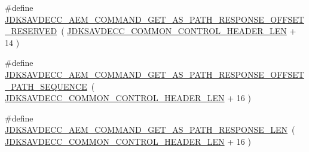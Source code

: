 \begin{DoxyCompactItemize}
\item 
\#define \hyperlink{group__command__get__as__path__response_gada12e4d8eb5af44c58b5d1138b524345}{J\+D\+K\+S\+A\+V\+D\+E\+C\+C\+\_\+\+A\+E\+M\+\_\+\+C\+O\+M\+M\+A\+N\+D\+\_\+\+G\+E\+T\+\_\+\+A\+S\+\_\+\+P\+A\+T\+H\+\_\+\+R\+E\+S\+P\+O\+N\+S\+E\+\_\+\+O\+F\+F\+S\+E\+T\+\_\+\+R\+E\+S\+E\+R\+V\+ED}~( \hyperlink{group__jdksavdecc__avtp__common__control__header_gaae84052886fb1bb42f3bc5f85b741dff}{J\+D\+K\+S\+A\+V\+D\+E\+C\+C\+\_\+\+C\+O\+M\+M\+O\+N\+\_\+\+C\+O\+N\+T\+R\+O\+L\+\_\+\+H\+E\+A\+D\+E\+R\+\_\+\+L\+EN} + 14 )
\item 
\#define \hyperlink{group__command__get__as__path__response_gae4ae69e0d41bc38112e06b24fd70028c}{J\+D\+K\+S\+A\+V\+D\+E\+C\+C\+\_\+\+A\+E\+M\+\_\+\+C\+O\+M\+M\+A\+N\+D\+\_\+\+G\+E\+T\+\_\+\+A\+S\+\_\+\+P\+A\+T\+H\+\_\+\+R\+E\+S\+P\+O\+N\+S\+E\+\_\+\+O\+F\+F\+S\+E\+T\+\_\+\+P\+A\+T\+H\+\_\+\+S\+E\+Q\+U\+E\+N\+CE}~( \hyperlink{group__jdksavdecc__avtp__common__control__header_gaae84052886fb1bb42f3bc5f85b741dff}{J\+D\+K\+S\+A\+V\+D\+E\+C\+C\+\_\+\+C\+O\+M\+M\+O\+N\+\_\+\+C\+O\+N\+T\+R\+O\+L\+\_\+\+H\+E\+A\+D\+E\+R\+\_\+\+L\+EN} + 16 )
\item 
\#define \hyperlink{group__command__get__as__path__response_gae249d2c201df47533ef09a8625037d05}{J\+D\+K\+S\+A\+V\+D\+E\+C\+C\+\_\+\+A\+E\+M\+\_\+\+C\+O\+M\+M\+A\+N\+D\+\_\+\+G\+E\+T\+\_\+\+A\+S\+\_\+\+P\+A\+T\+H\+\_\+\+R\+E\+S\+P\+O\+N\+S\+E\+\_\+\+L\+EN}~( \hyperlink{group__jdksavdecc__avtp__common__control__header_gaae84052886fb1bb42f3bc5f85b741dff}{J\+D\+K\+S\+A\+V\+D\+E\+C\+C\+\_\+\+C\+O\+M\+M\+O\+N\+\_\+\+C\+O\+N\+T\+R\+O\+L\+\_\+\+H\+E\+A\+D\+E\+R\+\_\+\+L\+EN} + 16 )
\end{DoxyCompactItemize}
